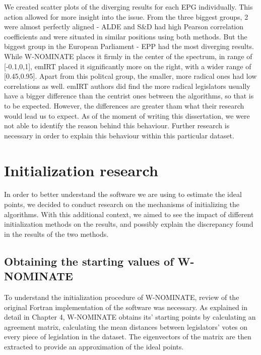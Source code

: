 \documentclass[a4paper,12pt]{report}
\begin{document}
    We created scatter plots of the diverging results for each EPG individually.
    This action allowed for more
    insight into the issue.
    From the three biggest groups, 2 were almost perfectly aligned - ALDE and S\&D had high
    Pearson correlation coefficients and were situated in similar positions using both methods. But the biggest
    group in the European Parliament - EPP had the most diverging results. While W-NOMINATE places it firmly in the
    center of the spectrum, in range of [-0.1,0,1], emIRT placed it significantly more on the right, with a wider range
    of [0.45,0.95]. Apart from this politcal group, the smaller, more radical ones had low correlations as well.
    emIRT authors did find the more radical legislators usually have a bigger difference than the centrist ones
    between the algorithms, so that is to be expected. However, the differences are greater tham what their research
    would lead us to expect.
    As of the moment of writing this dissertation, we were not able to identify the reason behind
    this behaviour.
    Further research is necessary in order to explain this behaviour within this particular dataset.


    \section{Initialization research}

    In order to better understand the software we are using to estimate the ideal points, we decided to conduct
    research on the mechanisms of initializing the algorithms.
    With this additional context, we aimed to see the
    impact of different initialization methods on the results, and possibly explain the discrepancy found in the
    results of the two methods.

    \subsection{Obtaining the starting values of W-NOMINATE}\label{subsec:obtaining-the-starting-values-of-w-nominate}
    To understand the initialization procedure of W-NOMINATE, review of the original Fortran implementation of the
    software was necessary.
    As explained in detail in Chapter 4, W-NOMINATE obtains its' starting points by
    calculating an agreement matrix, calculating the mean distances
    between legislators' votes on every piece of legislation in the dataset. The eigenvectors of the matrix are then
    extracted to provide an approximation of the ideal points.
\end{document}
